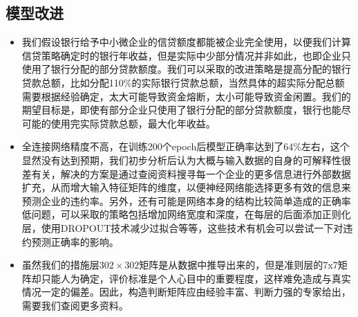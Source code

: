 \documentclass{cumcmthesis}
\begin{document}
\subsection{模型改进}
\begin{itemize}
    \item 我们假设银行给予中小微企业的信贷额度都能被企业完全使用，以便我们计算信贷策略确定时的银行年收益，但是实际中少部分情况并非如此，也即企业只使用了银行分配的部分贷款额度。我们可以采取的改进策略是提高分配的银行贷款总额，比如分配110\%的实际银行贷款总额，当然具体的超实际分配总额需要根据经验确定，太大可能导致资金熔断，太小可能导致资金闲置。我们的期望目标是，即使有部分企业只使用了银行分配的部分贷款额度，银行也能尽可能的使用完实际贷款总额，最大化年收益。
    \item 全连接网络精度不高，在训练200个epoch后模型正确率达到了64\%左右，这个显然没有达到预期，我们初步分析后认为大概与输入数据的自身的可解释性很差有关，解决的方案是通过查阅资料搜寻每一个企业的更多信息进行外部数据扩充，从而增大输入特征矩阵的维度，以便神经网络能选择更多有效的信息来预测企业的违约率。另外，还有可能是网络本身的结构比较简单造成的正确率低问题，可以采取的策略包括增加网络宽度和深度，在每层的后面添加正则化层，使用DROPOUT技术减少过拟合等等，这些技术有机会可以尝试一下对违约预测正确率的影响。
    \item 虽然我们的措施层$302 \times 302$矩阵是从数据中推导出来的，但是准则层的7x7矩阵却只能人为确定，评价标准是个人心目中的重要程度，这样难免造成与真实情况一定的偏差。因此，构造判断矩阵应由经验丰富、判断力强的专家给出，需要我们查阅更多资料。
\end{itemize}
\end{document}
